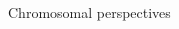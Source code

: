 \begin{columns}[t]
\begin{column}{0.5\textwidth}
\begin{block}{\large Chromosomal perspectives}
\begin{columns}
\begin{column}{0.55\textwidth}
        \end{column}
      \end{columns}

    \end{block}
  \end{column}

\end{columns}


